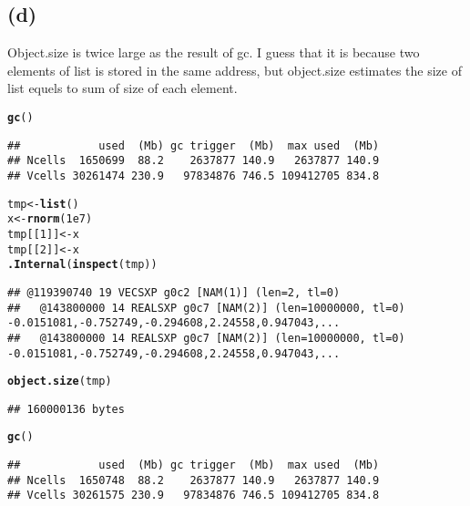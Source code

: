 \documentclass{article}\usepackage[]{graphicx}\usepackage[]{color}
\makeatletter
\newcommand{\hlnum}[1]{\textcolor[rgb]{0.686,0.059,0.569}{#1}}%
\newcommand{\hlstd}[1]{\textcolor[rgb]{0.345,0.345,0.345}{#1}}%
\newcommand{\hlkwb}[1]{\textcolor[rgb]{0.69,0.353,0.396}{#1}}%
\newcommand{\hlkwd}[1]{\textcolor[rgb]{0.737,0.353,0.396}{\textbf{#1}}}%
\newenvironment{kframe}{%
 \def\at@end@of@kframe{}%
 \ifinner\ifhmode%
  \def\at@end@of@kframe{\end{minipage}}%
  \begin{minipage}{\columnwidth}%
 \fi\fi%
 \def\FrameCommand##1{\hskip\@totalleftmargin \hskip-\fboxsep
 \colorbox{shadecolor}{##1}\hskip-\fboxsep
     \hskip-\linewidth \hskip-\@totalleftmargin \hskip\columnwidth}%
 \MakeFramed {\advance\hsize-\width
   \@totalleftmargin\z@ \linewidth\hsize
   \@setminipage}}%
 {\par\unskip\endMakeFramed%
 \at@end@of@kframe}
\newenvironment{knitrout}{}{} %
\makeatother
\begin{document}
\subsection{(d)}
Object.size is twice large as the result of gc. I guess that it is because two elements of list is stored in the same address, but object.size estimates the size of list equels to sum of size of each element.
\begin{knitrout}
\color{fgcolor}\begin{kframe}
\begin{alltt}
\hlkwd{gc}\hlstd{()}
\end{alltt}
\begin{verbatim}
##            used  (Mb) gc trigger  (Mb)  max used  (Mb)
## Ncells  1650699  88.2    2637877 140.9   2637877 140.9
## Vcells 30261474 230.9   97834876 746.5 109412705 834.8
\end{verbatim}
\begin{alltt}
\hlstd{tmp} \hlkwb{<-} \hlkwd{list}\hlstd{()}
\hlstd{x} \hlkwb{<-} \hlkwd{rnorm}\hlstd{(}\hlnum{1e7}\hlstd{)}
\hlstd{tmp[[}\hlnum{1}\hlstd{]]} \hlkwb{<-} \hlstd{x}
\hlstd{tmp[[}\hlnum{2}\hlstd{]]} \hlkwb{<-} \hlstd{x}
\hlkwd{.Internal}\hlstd{(}\hlkwd{inspect}\hlstd{(tmp))}
\end{alltt}
\begin{verbatim}
## @119390740 19 VECSXP g0c2 [NAM(1)] (len=2, tl=0)
##   @143800000 14 REALSXP g0c7 [NAM(2)] (len=10000000, tl=0) -0.0151081,-0.752749,-0.294608,2.24558,0.947043,...
##   @143800000 14 REALSXP g0c7 [NAM(2)] (len=10000000, tl=0) -0.0151081,-0.752749,-0.294608,2.24558,0.947043,...
\end{verbatim}
\begin{alltt}
\hlkwd{object.size}\hlstd{(tmp)}
\end{alltt}
\begin{verbatim}
## 160000136 bytes
\end{verbatim}
\begin{alltt}
\hlkwd{gc}\hlstd{()}
\end{alltt}
\begin{verbatim}
##            used  (Mb) gc trigger  (Mb)  max used  (Mb)
## Ncells  1650748  88.2    2637877 140.9   2637877 140.9
## Vcells 30261575 230.9   97834876 746.5 109412705 834.8
\end{verbatim}
\end{kframe}
\end{knitrout}
\end{document}
